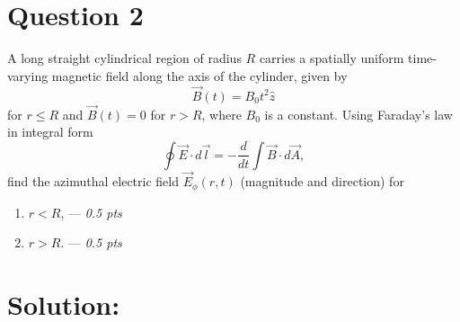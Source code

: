 \section*{Question 2}
A long straight cylindrical region of radius $R$ carries a spatially uniform time-varying magnetic field along the axis of the cylinder, given by
\[
\vec{B}(t) = B_0 t^2 \hat{z}
\]
for $r \leq R$ and $\vec{B}(t) = 0 $ for $r > R$, where $B_0$ is a constant. Using Faraday's law in integral form
\[
\oint \vec{E} \cdot d\vec{l} = -\frac{d}{dt} \int \vec{B} \cdot d\vec{A},
\]
find the azimuthal electric field \(\vec{E}_{\phi}(r,t)\) (magnitude and direction) for
    \begin{enumerate}
      \item[(a)] \(r < R\), --- \textit{0.5 pts}
      \item[(b)] \(r > R\). --- \textit{0.5 pts}
    \end{enumerate}

\section*{Solution:}

